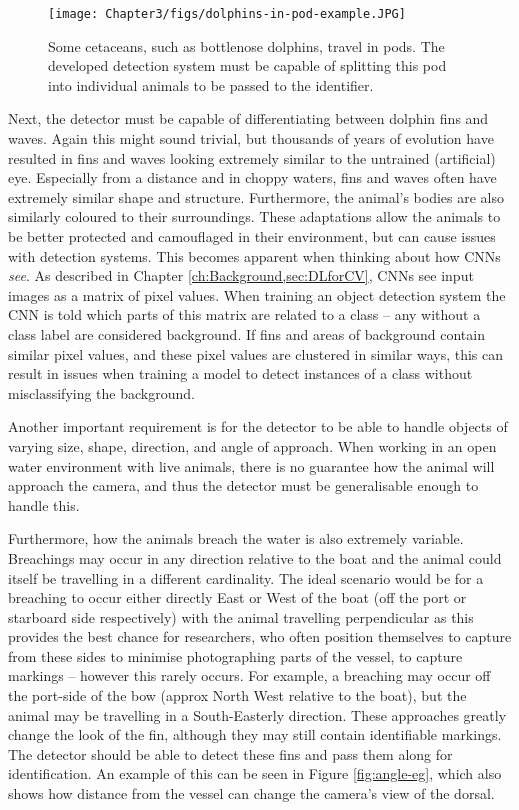  \begin{figure}
 	\begin{center}
 		\texttt{[image: Chapter3/figs/dolphins-in-pod-example.JPG]}
 	\end{center}
 	\caption{Some cetaceans, such as bottlenose dolphins, travel in pods. The developed detection system must be capable of splitting this pod into individual animals to be passed to the identifier.
 	}
 	\label{fig:pod-eg}
 \end{figure}

 Next, the detector must be capable of differentiating between dolphin fins and waves. Again this might sound trivial, but thousands of years of evolution have resulted in fins and waves looking extremely similar to the untrained (artificial) eye. Especially from a distance and in choppy waters, fins and waves often have extremely similar shape and structure. Furthermore, the animal's bodies are also similarly coloured to their surroundings. These adaptations allow the animals to be better protected and camouflaged in their environment, but can cause issues with detection systems. This becomes apparent when thinking about how CNNs \textit{see}. As described in Chapter \ref{ch:Background,sec:DLforCV}, CNNs see input images as a matrix of pixel values. When training an object detection system the CNN is told which parts of this matrix are related to a class -- any without a class label are considered background. If fins and areas of background contain similar pixel values, and these pixel values are clustered in similar ways, this can result in issues when training a model to detect instances of a class without misclassifying the background. 
 
 Another important requirement is for the detector to be able to handle objects of varying size, shape, direction, and angle of approach. When working in an open water environment with live animals, there is no guarantee how the animal will approach the camera, and thus the detector must be generalisable enough to handle this. 
 
 Furthermore, how the animals breach the water is also extremely variable. Breachings may occur in any direction relative to the boat and the animal could itself be travelling in a different cardinality. The ideal scenario would be for a breaching to occur either directly East or West of the boat (off the port or starboard side respectively) with the animal travelling perpendicular as this provides the best chance for researchers, who often position themselves to capture from these sides to minimise photographing parts of the vessel, to capture markings -- however this rarely occurs. For example, a breaching may occur off the port-side of the bow (approx North West relative to the boat), but the animal may be travelling in a South-Easterly direction. These approaches greatly change the look of the fin, although they may still contain identifiable markings. The detector should be able to detect these fins and pass them along for identification. An example of this can be seen in Figure \ref{fig:angle-eg}, which also shows how distance from the vessel can change the camera's view of the dorsal. 
 
